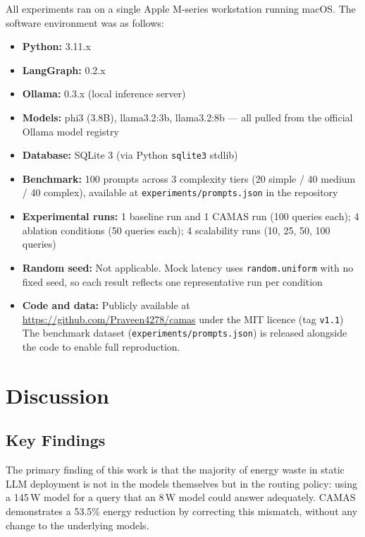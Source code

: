 \documentclass[journal]{IEEEtran}
\begin{document}
All experiments ran on a single Apple M-series workstation running macOS.
The software environment was as follows:

\begin{itemize}
    \item \textbf{Python:} 3.11.x
    \item \textbf{LangGraph:} 0.2.x
    \item \textbf{Ollama:} 0.3.x (local inference server)
    \item \textbf{Models:} phi3 (3.8B), llama3.2:3b, llama3.2:8b — all
          pulled from the official Ollama model registry
    \item \textbf{Database:} SQLite 3 (via Python \texttt{sqlite3} stdlib)
    \item \textbf{Benchmark:} 100 prompts across 3 complexity tiers
          (20 simple / 40 medium / 40 complex), available at
          \texttt{experiments/prompts.json} in the repository
    \item \textbf{Experimental runs:} 1 baseline run and 1 CAMAS run
          (100 queries each); 4 ablation conditions (50 queries each);
          4 scalability runs (10, 25, 50, 100 queries)
    \item \textbf{Random seed:} Not applicable. Mock latency uses
          \texttt{random.uniform} with no fixed seed, so each result
          reflects one representative run per condition
    \item \textbf{Code and data:} Publicly available at
          \url{https://github.com/Praveen4278/camas} under the MIT
          licence (tag \texttt{v1.1}) The benchmark dataset
          (\texttt{experiments/prompts.json}) is released alongside the
          code to enable full reproduction.
\end{itemize}

\section{Discussion}

\subsection{Key Findings}

The primary finding of this work is that the majority of energy waste in static
LLM deployment is not in the models themselves but in the routing policy: using
a 145\,W model for a query that an 8\,W model could answer adequately. CAMAS
demonstrates a 53.5\% energy reduction by correcting this mismatch, without
any change to the underlying models.
\end{document}
